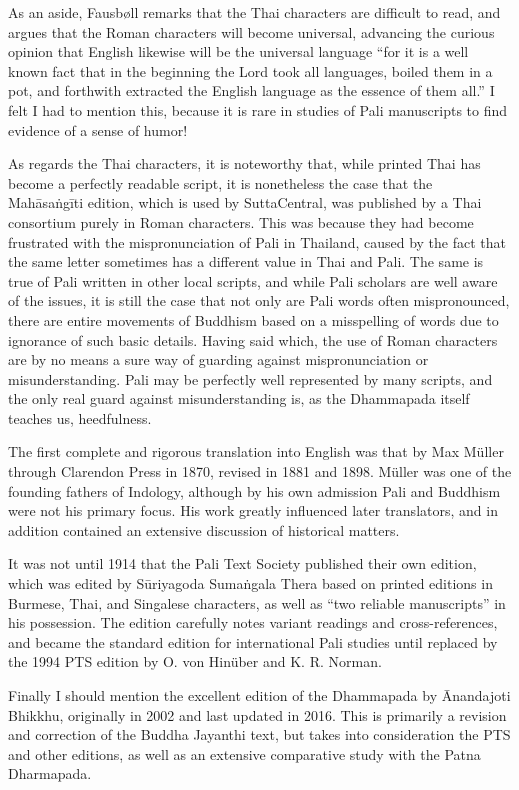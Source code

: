 \documentclass[12pt,openany]{book}%
\begin{document}
As an aside, Fausbøll remarks that the Thai characters are difficult to read, and argues that the Roman characters will become universal, advancing the curious opinion that English likewise will be the universal language “for it is a well known fact that in the beginning the Lord took all languages, boiled them in a pot, and forthwith extracted the English language as the essence of them all.” I felt I had to mention this, because it is rare in studies of Pali manuscripts to find evidence of a sense of humor!

As regards the Thai characters, it is noteworthy that, while printed Thai has become a perfectly readable script, it is nonetheless the case that the \textsanskrit{Mahāsaṅgīti} edition, which is used by SuttaCentral, was published by a Thai consortium purely in Roman characters. This was because they had become frustrated with the mispronunciation of Pali in Thailand, caused by the fact that the same letter sometimes has a different value in Thai and Pali. The same is true of Pali written in other local scripts, and while Pali scholars are well aware of the issues, it is still the case that not only are Pali words often mispronounced, there are entire movements of Buddhism based on a misspelling of words due to ignorance of such basic details. Having said which, the use of Roman characters are by no means a sure way of guarding against mispronunciation or misunderstanding. Pali may be perfectly well represented by many scripts, and the only real guard against misunderstanding is, as the Dhammapada itself teaches us, heedfulness.

The first complete and rigorous translation into English was that by Max Müller through Clarendon Press in 1870, revised in 1881 and 1898. Müller was one of the founding fathers of Indology, although by his own admission Pali and Buddhism were not his primary focus. His work greatly influenced later translators, and in addition contained an extensive discussion of historical matters.

It was not until 1914 that the Pali Text Society published their own edition, which was edited by \textsanskrit{Sūriyagoda} \textsanskrit{Sumaṅgala} Thera based on printed editions in Burmese, Thai, and Singalese characters, as well as “two reliable manuscripts” in his possession. The edition carefully notes variant readings and cross-references, and became the standard edition for international Pali studies until replaced by the 1994 PTS edition by O. von Hinüber and K. R. Norman.

Finally I should mention the excellent edition of the Dhammapada by Ānandajoti Bhikkhu, originally in 2002 and last updated in 2016. This is primarily a revision and correction of the Buddha Jayanthi text, but takes into consideration the PTS and other editions, as well as an extensive comparative study with the Patna Dharmapada.
\end{document}
